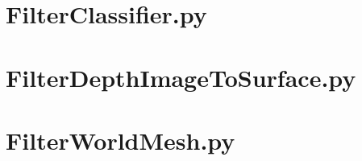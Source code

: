 \documentclass[botnum, nobox]{unmeethesis}
\begin{document}
\section{FilterClassifier.py}

\section{FilterDepthImageToSurface.py}

\section{FilterWorldMesh.py}





\end{document}
